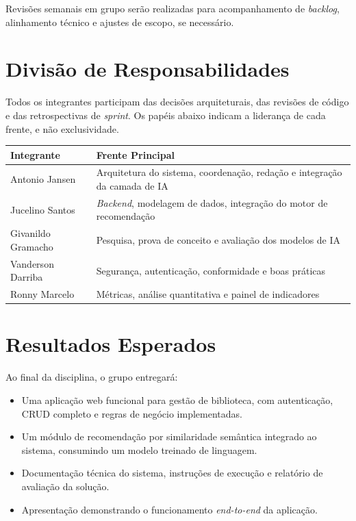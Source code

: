 \vspace{0.3cm}

Revisões semanais em grupo serão realizadas para acompanhamento de \textit{backlog}, alinhamento técnico e ajustes de escopo, se necessário.

\section{Divisão de Responsabilidades}

Todos os integrantes participam das decisões arquiteturais, das revisões de código e das retrospectivas de \textit{sprint}. Os papéis abaixo indicam a liderança de cada frente, e não exclusividade.

\vspace{0.3cm}

\begin{center}
\begin{tabularx}{\textwidth}{@{} l X @{}}
\toprule
\textbf{Integrante} & \textbf{Frente Principal} \\
\midrule
Antonio Jansen & Arquitetura do sistema, coordenação, redação e integração da camada de IA \\
Jucelino Santos & \textit{Backend}, modelagem de dados, integração do motor de recomendação \\
Givanildo Gramacho & Pesquisa, prova de conceito e avaliação dos modelos de IA \\
Vanderson Darriba & Segurança, autenticação, conformidade e boas práticas \\
Ronny Marcelo & Métricas, análise quantitativa e painel de indicadores \\
\bottomrule
\end{tabularx}
\end{center}

\section{Resultados Esperados}

Ao final da disciplina, o grupo entregará:

\begin{itemize}
    \item Uma aplicação web funcional para gestão de biblioteca, com autenticação, CRUD completo e regras de negócio implementadas.
    \item Um módulo de recomendação por similaridade semântica integrado ao sistema, consumindo um modelo treinado de linguagem.
    \item Documentação técnica do sistema, instruções de execução e relatório de avaliação da solução.
    \item Apresentação demonstrando o funcionamento \textit{end-to-end} da aplicação.
\end{itemize}


